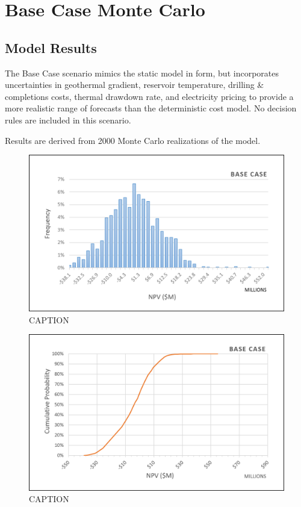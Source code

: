 \section{Base Case Monte Carlo}

\subsection{Model Results}
\label{ch6:base_results}

The Base Case scenario mimics the static model in form, but incorporates uncertainties in geothermal gradient, reservoir temperature, drilling \& completions costs, thermal drawdown rate, and electricity pricing to provide a more realistic range of forecasts than the deterministic cost model. No decision rules are included in this scenario. 

Results are derived from 2000 Monte Carlo realizations of the model. 

\begin{figure}[!htp]
\centering
\includegraphics[width=.98\textwidth]{templates/images/Figure-Base_Case_Histogram.png}
\caption[Probabilistic Base Case histogram]{CAPTION}
\label{fig:base_case_hist}
\end{figure}

\begin{figure}[!htp]
\centering
\includegraphics[width=.98\textwidth]{templates/images/Figure-Base_Case_CDF.png}
\caption[Probabilistic Base Case CDF]{CAPTION}
\label{fig:base_case_cdf}
\end{figure}

